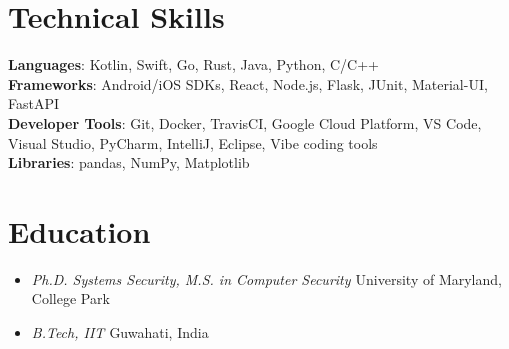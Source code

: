 \documentclass[letterpaper,10pt]{article}
\newcommand{\resumeSubheadingItem}[1]{
   \item\textit{\small{
       {#1 \vspace{-2pt}}}
  }
}
\newcommand{\resumeSubHeadingListStart}{\begin{itemize}[leftmargin=0.15in, label={}]}
\newcommand{\resumeSubHeadingListEnd}{\end{itemize}}
\begin{document}
\section{Technical Skills}
 \begin{itemize}[leftmargin=0.15in, label={}]
    \small{\item{
     \textbf{Languages}{: Kotlin, Swift, Go, Rust, Java, Python, C/C++} \\
     \textbf{Frameworks}{: Android/iOS SDKs, React, Node.js, Flask, JUnit, Material-UI, FastAPI} \\
     \textbf{Developer Tools}{: Git, Docker, TravisCI, Google Cloud Platform, VS Code, Visual Studio, PyCharm, IntelliJ, Eclipse, Vibe coding tools} \\
     \textbf{Libraries}{: pandas, NumPy, Matplotlib}
    }}
 \end{itemize}

\section{Education}
  \resumeSubHeadingListStart
    \resumeSubheadingItem
      {Ph.D. Systems Security, M.S. in Computer Security}{University of Maryland, College Park}
    \resumeSubheadingItem
      {B.Tech, IIT}{Guwahati, India}
  \resumeSubHeadingListEnd
\end{document}
